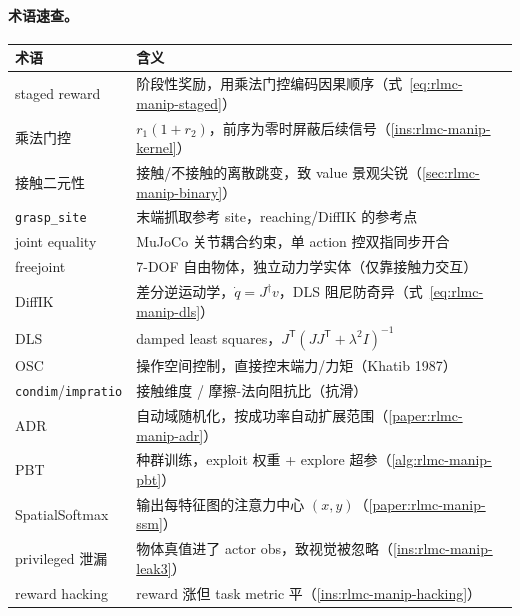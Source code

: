 \paragraph{术语速查。}
\begin{center}
\small
\begin{tabular}{@{}ll@{}}
\toprule
术语 & 含义 \\
\midrule
staged reward & 阶段性奖励，用乘法门控编码因果顺序（式~\eqref{eq:rlmc-manip-staged}） \\
乘法门控 & $r_1(1+r_2)$，前序为零时屏蔽后续信号（\cref{ins:rlmc-manip-kernel}） \\
接触二元性 & 接触/不接触的离散跳变，致 value 景观尖锐（\cref{sec:rlmc-manip-binary}） \\
\verb|grasp_site| & 末端抓取参考 site，reaching/DiffIK 的参考点 \\
joint equality & MuJoCo 关节耦合约束，单 action 控双指同步开合 \\
freejoint & 7-DOF 自由物体，独立动力学实体（仅靠接触力交互） \\
DiffIK & 差分逆运动学，$\dot q=J^\dagger v$，DLS 阻尼防奇异（式~\eqref{eq:rlmc-manip-dls}） \\
DLS & damped least squares，$J^{\mathsf T}(JJ^{\mathsf T}+\lambda^2 I)^{-1}$ \\
OSC & 操作空间控制，直接控末端力/力矩（Khatib 1987） \\
\verb|condim|/\allowbreak\verb|impratio| & 接触维度 / 摩擦-法向阻抗比（抗滑） \\
ADR & 自动域随机化，按成功率自动扩展范围（\cref{paper:rlmc-manip-adr}） \\
PBT & 种群训练，exploit 权重 + explore 超参（\cref{alg:rlmc-manip-pbt}） \\
SpatialSoftmax & 输出每特征图的注意力中心 $(x,y)$（\cref{paper:rlmc-manip-ssm}） \\
privileged 泄漏 & 物体真值进了 actor obs，致视觉被忽略（\cref{ins:rlmc-manip-leak3}） \\
reward hacking & reward 涨但 task metric 平（\cref{ins:rlmc-manip-hacking}） \\
\bottomrule
\end{tabular}
\end{center}

